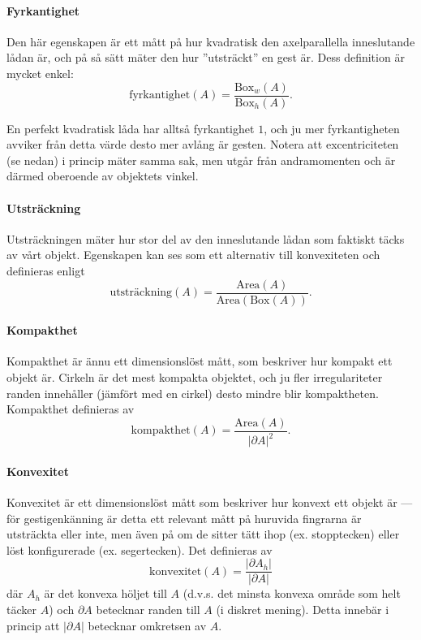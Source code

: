 \documentclass[../rapport_MVEX01-11-05]{subfiles}
\begin{document}
\paragraph{Fyrkantighet}

Den här egenskapen är ett mått på hur kvadratisk den axelparallella
inneslutande lådan är, och på så sätt mäter den hur ''utsträckt'' en
gest är. Dess definition är mycket enkel:
\begin{equation*}
  \textrm{fyrkantighet}(A) = \frac{\textrm{Box}_w(A)}{\textrm{Box}_h(A)}.
\end{equation*}

En perfekt kvadratisk låda har alltså fyrkantighet $1$, och ju mer
fyrkantigheten avviker från detta värde desto mer avlång är gesten.
Notera att excentriciteten (se nedan) i princip mäter samma sak, men utgår från
andramomenten och är därmed oberoende av objektets vinkel.

\paragraph{Utsträckning}

Utsträckningen mäter hur stor del av den inneslutande lådan som
faktiskt täcks av vårt objekt. Egenskapen kan ses som ett alternativ
till konvexiteten och definieras enligt
\begin{equation*}
  \textrm{utsträckning}(A) =
  \frac{\textrm{Area}(A)}{\textrm{Area}(\textrm{Box}(A))}.
\end{equation*}

\paragraph{Kompakthet}

Kompakthet \cite[s.~26]{Rudemo09} är ännu ett dimensionslöst mått, som
beskriver hur kompakt ett objekt är.
Cirkeln är det mest kompakta objektet, och ju fler irregulariteter
randen innehåller (jämfört med en cirkel) desto mindre blir kompaktheten.
Kompakthet definieras av
\begin{equation*}
  \textrm{kompakthet}(A) = \frac{\textrm{Area}(A)}{\left|\partial
  A\right|^2}.
\end{equation*}

\paragraph{Konvexitet}

Konvexitet \cite[s.~26]{Rudemo09} är ett dimensionslöst
mått som beskriver hur konvext ett objekt är --- för
gestigenkänning är detta ett relevant mått på huruvida fingrarna är
utsträckta eller inte, men även på om de sitter tätt ihop (ex.
stopptecken) eller löst konfigurerade (ex. segertecken). Det
definieras av
\begin{equation*}
  \textrm{konvexitet}(A) = \frac{\left|\partial A_h\right|}{\left|\partial A\right|}
\end{equation*}
där $A_h$ är det konvexa höljet till $A$ (d.v.s. det minsta konvexa område som
helt täcker $A$) och $\partial A$ betecknar randen till $A$ (i diskret
mening). Detta innebär i princip att $\left|\partial A\right|$
betecknar omkretsen av $A$.
\end{document}
